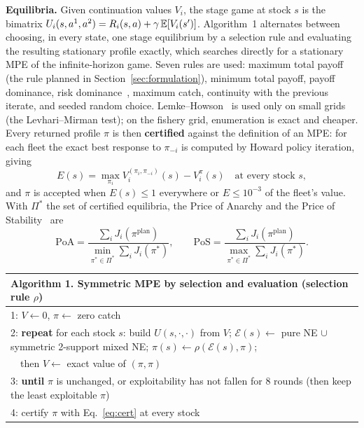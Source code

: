 \textbf{Equilibria.} Given continuation values $V_i$, the stage game at stock $s$ is the bimatrix
$U_i(s,a^1,a^2)=R_i(s,a)+\gamma\,\mathbb{E}[V_i(s')]$. Algorithm~1 alternates between choosing, in every state, one stage
equilibrium by a selection rule and evaluating the resulting stationary profile exactly, which searches directly for a
stationary MPE of the infinite-horizon game. Seven rules are used: maximum total payoff (the rule planned in
Section~\ref{sec:formulation}), minimum total payoff, payoff dominance, risk dominance~\cite{harsanyi1988}, maximum
catch, continuity with the previous iterate, and seeded random choice. Lemke--Howson~\cite{lemke1964} is used only on
small grids (the Levhari--Mirman test); on the fishery grid, enumeration is exact and cheaper. Every returned profile
$\pi$ is then \textbf{certified} against the definition of an MPE: for each fleet the exact best response to $\pi_{-i}$
is computed by Howard policy iteration, giving
\begin{equation}\label{eq:cert}
E(s)=\max_{\pi_i}V_i^{(\pi_i,\pi_{-i})}(s)-V_i^{\pi}(s)\quad\text{at every stock } s,
\end{equation}
and $\pi$ is accepted when $E(s)\le1$ everywhere or $E\le10^{-3}$ of the fleet's value. With $\Pi^*$ the set of
certified equilibria, the Price of Anarchy and the Price of Stability~\cite{koutsoupias1999,anshelevich2004} are
\begin{equation}\label{eq:poa}
\mathrm{PoA}=\frac{\sum_i J_i(\pi^{\mathrm{plan}})}{\min_{\pi^*\in\Pi^*}\sum_i J_i(\pi^*)},\qquad
\mathrm{PoS}=\frac{\sum_i J_i(\pi^{\mathrm{plan}})}{\max_{\pi^*\in\Pi^*}\sum_i J_i(\pi^*)}.
\end{equation}

\begin{table}[H]
\centering
\small
\begin{tabular}{p{15.5cm}}
\toprule
\textbf{Algorithm 1.} Symmetric MPE by selection and evaluation (selection rule $\rho$) \\
\midrule
1: $V\leftarrow 0$, $\pi\leftarrow$ zero catch \\
2: \textbf{repeat} for each stock $s$: build $U(s,\cdot,\cdot)$ from $V$; $\mathcal E(s)\leftarrow$ pure NE $\cup$ symmetric 2-support mixed NE; $\pi(s)\leftarrow\rho(\mathcal E(s),\pi)$; \\
\quad\ \ then $V\leftarrow$ exact value of $(\pi,\pi)$ \\
3: \textbf{until} $\pi$ is unchanged, or exploitability has not fallen for 8 rounds (then keep the least exploitable $\pi$) \\
4: certify $\pi$ with Eq.~\eqref{eq:cert} at every stock \\
\bottomrule
\end{tabular}
\end{table}

